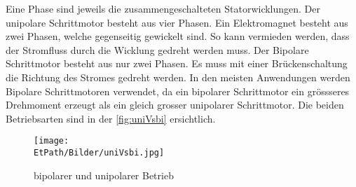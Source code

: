     Eine Phase sind jeweils die zusammengeschalteten Statorwicklungen. Der 
    unipolare Schrittmotor besteht aus vier Phasen. Ein Elektromagnet besteht 
    aus zwei Phasen, welche gegenseitig gewickelt sind. So kann vermieden 
    werden, dass der Stromfluss durch die Wicklung gedreht werden muss. Der 
    Bipolare Schrittmotor besteht aus nur zwei Phasen. Es muss mit einer 
    Brückenschaltung die Richtung des Stromes gedreht werden. In den meisten 
    Anwendungen werden Bipolare Schrittmotoren verwendet, da ein bipolarer 
    Schrittmotor ein grössseres Drehmoment erzeugt als ein gleich grosser 
    unipolarer Schrittmotor. Die beiden Betriebsarten sind in der 
    \autoref{fig:uniVsbi} ersichtlich. \cite{Doku:Stepper}
    \begin{figure}[h!]
       	\centering
       	\texttt{[image: \\EtPath/Bilder/uniVsbi.jpg]}
       	\caption[bipolarer und unipolarer Betrieb]{bipolarer und unipolarer Betrieb \cite{Doku:Stepper}}
       	\label{fig:uniVsbi}
    \end{figure}
    
       
    
